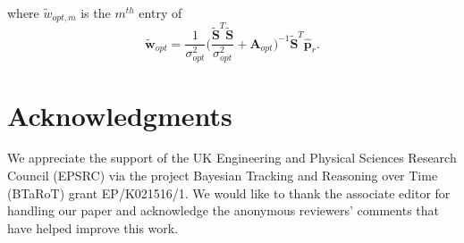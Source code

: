 \documentclass[10pt,final]{IEEEtran}
\begin{document}
where $\tilde{w}_{opt,m}$ is the $m^{th}$ entry of
\begin{equation}\label{eq:bcs19}
  \tilde{\textbf{w}}_{opt} = \frac{1}{\sigma^{2}_{opt}}\Bigg(\frac{\tilde{\textbf{S}}^{T}\tilde{\textbf{S}}}{\sigma^{2}_{opt}}+\textbf{A}_{opt}\Bigg)^{-1}\tilde{\textbf{S}}^{T}\hat{\textbf{p}}_{r}.
\end{equation}

\section*{Acknowledgments}

\noindent We appreciate the support of the UK Engineering and Physical Sciences Research Council (EPSRC) via the project Bayesian Tracking and Reasoning over Time (BTaRoT) grant EP/K021516/1.  We would like to thank the associate editor for handling our paper and acknowledge the anonymous reviewers' comments that have helped improve this work.
\end{document}
